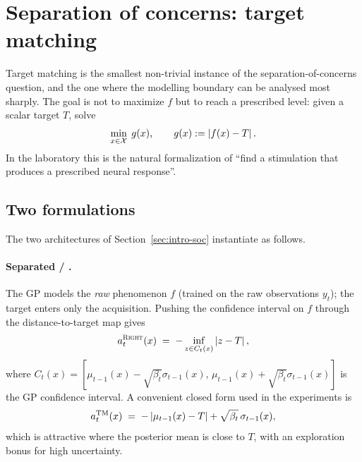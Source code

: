 \section{Separation of concerns: target matching}
\label{sec:contrib-tm}

Target matching is the smallest non-trivial instance of the separation-of-concerns
question, and the one where the modelling boundary can be analysed most sharply.
The goal is not to maximize $f$ but to reach a prescribed level: given a scalar
target $T$, solve
\begin{equation}
  \min_{x\in\mathcal{X}}\; g(x), \qquad g(x):=\left\lvert f(x)-T\right\rvert.
  \label{eq:tm-problem}
\end{equation}
In the laboratory this is the natural formalization of ``find a stimulation that
produces a prescribed neural response''.

\subsection{Two formulations}
\label{sec:contrib-tm-two}

The two architectures of Section~\ref{sec:intro-soc} instantiate as follows.

\paragraph{Separated / \RIGHT.}
The GP models the \emph{raw} phenomenon $f$ (trained on the raw observations
$y_t$); the target enters only the acquisition. Pushing the confidence interval
on $f$ through the distance-to-target map gives
\begin{equation}
  a_t^{\textsc{Right}}(x) \;=\; -\inf_{z\in C_t(x)}\left\lvert z-T\right\rvert,
  \label{eq:tm-right-full}
\end{equation}
where $C_t(x)=[\mu_{t-1}(x)-\sqrt{\beta_t}\sigma_{t-1}(x),\,
\mu_{t-1}(x)+\sqrt{\beta_t}\sigma_{t-1}(x)]$ is the GP confidence interval. A
convenient closed form used in the experiments is
\begin{equation}
  a_t^{\mathrm{TM}}(x) \;=\; -\left\lvert \mu_{t-1}(x)-T\right\rvert+\sqrt{\beta_t}\,\sigma_{t-1}(x),
  \label{eq:tm-right-simple}
\end{equation}
which is attractive where the posterior mean is close to $T$, with an exploration
bonus for high uncertainty.

